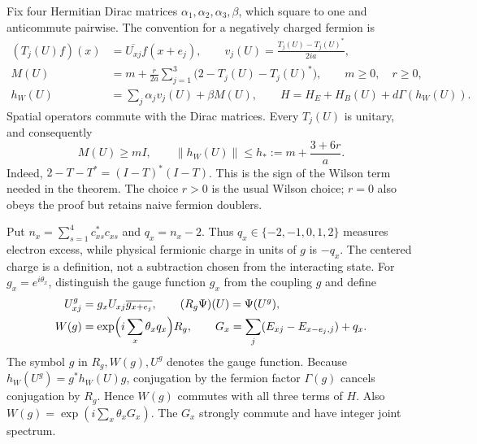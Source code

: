 Fix four Hermitian Dirac matrices $\alpha_1,\alpha_2,\alpha_3,\beta$,
which square to one and anticommute pairwise.  The convention for a
negatively charged fermion is
\begin{align}
 (T_j(U)f)(x)&=\overline{U_{xj}}f(x+e_j),\qquad
 v_j(U)=\frac{T_j(U)-T_j(U)^*}{2ia},\label{lat-hopping}\\
 M(U)&=m+\frac r{2a}\sum_{j=1}^3
             \bigl(2-T_j(U)-T_j(U)^*\bigr),\qquad m\ge0,\quad r\ge0,
 \label{lat-wilson-mass}\\
 h_W(U)&=\sum_j\alpha_j v_j(U)+\beta M(U),\qquad
 H=H_E+H_B(U)+d\Gamma(h_W(U)).\label{lat-hamiltonian}
\end{align}
Spatial operators commute with the Dirac matrices.  Every $T_j(U)$ is
unitary, and consequently
\begin{equation}
 M(U)\ge mI,\qquad
 \|h_W(U)\|\le h_*:=m+\frac{3+6r}{a}.
 \label{lat-mass-positive}
\end{equation}
Indeed, $2-T-T^*=(I-T)^*(I-T)$.  This is the sign of the Wilson
term needed in the theorem.  The choice $r>0$ is the usual Wilson choice;
$r=0$ also obeys the proof but retains naive fermion doublers.

Put $n_x=\sum_{s=1}^4 c_{xs}^*c_{xs}$ and $q_x=n_x-2$.
Thus $q_x\in\{-2,-1,0,1,2\}$ measures electron excess, while physical
fermionic charge in units of $g$ is $-q_x$.  The centered charge is a
definition, not a subtraction chosen from the interacting state.
For $g_x=e^{i\theta_x}$, distinguish the gauge function $g_x$ from the
coupling $g$ and define
\begin{align}
 U^g_{xj}&=g_xU_{xj}\overline{g_{x+e_j}},\qquad
 (R_g\Psi)(U)=\Psi(U^g),\nonumber\\
 W(g)&=\exp\Bigl(i\sum_x\theta_xq_x\Bigr)R_g,
 \qquad
 G_x=\sum_j(E_{xj}-E_{x-e_j,j})+q_x.
 \label{lat-gauge-unitary}
\end{align}
The symbol $g$ in $R_g,W(g),U^g$ denotes the gauge function.
Because $h_W(U^g)=g^*h_W(U)g$, conjugation by the fermion factor
$\Gamma(g)$ cancels conjugation by $R_g$.  Hence $W(g)$ commutes
with all three terms of $H$.  Also
$W(g)=\exp(i\sum_x\theta_xG_x)$.
The $G_x$ strongly commute and have integer joint spectrum.


